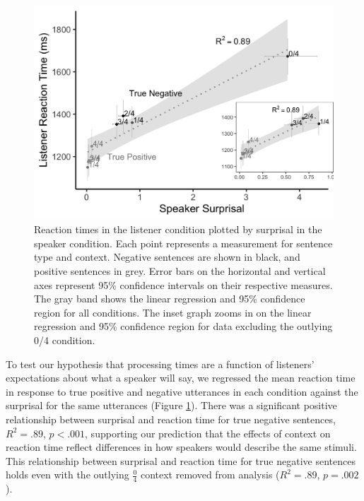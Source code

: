 \documentclass[man, floatsintext, noapacite]{apa6}
\begin{document}
\begin{figure}[t]
\begin{center} 
\includegraphics[width=6in]{figures/experiment1/speaker_v_listener.png}
\caption{\label{fig:exp1_scatter} Reaction times in the listener condition plotted by surprisal in the speaker condition. Each point represents a measurement for sentence type and context. Negative sentences are shown in black, and positive sentences in grey. Error bars on the horizontal and vertical axes represent 95\% confidence intervals on their respective measures. The gray band shows the linear regression and  95\% confidence region for all conditions. The inset graph zooms in on the linear regression and 95\% confidence region for data excluding the outlying 0/4 condition.}
\end{center} 
\end{figure}

To test our hypothesis that processing times are a function of listeners' expectations about what a speaker will say, we regressed the mean reaction time in response to true positive and negative utterances in each condition against the surprisal for the same utterances (Figure \ref{fig:exp1_scatter}).  There was a significant positive relationship between surprisal and reaction time for true negative sentences, $R^2=.89$, $p<.001$, supporting our prediction that the effects of context on reaction time reflect differences in how speakers would describe the same stimuli. This relationship between surprisal and reaction time for true negative sentences holds even with the outlying $\frac{0}{4}$ context removed from analysis ($R^2=.89$, $p = .002$).
\end{document}
